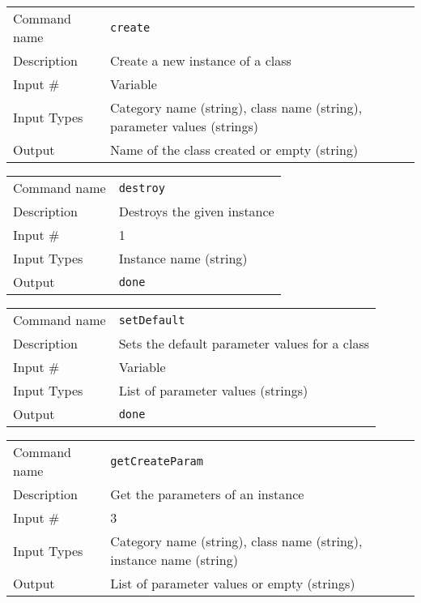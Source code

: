 \noindent
\begin{tabular}{l|p{5in}}
\hline
Command name & {\tt create} \\
Description  & Create a new instance of a class \\
Input \#     & Variable \\
Input Types  & Category name (string), class name (string), parameter values
               (strings) \\
Output       & Name of the class created or empty (string) \\
\hline
\end{tabular}

\bigskip

\noindent
\begin{tabular}{l|p{5in}}
\hline
Command name & {\tt destroy} \\
Description  & Destroys the given instance \\
Input \#     & 1 \\
Input Types  & Instance name (string) \\
Output       & {\tt done} \\
\hline
\end{tabular}

\bigskip

\noindent
\begin{tabular}{l|p{5in}}
\hline
Command name & {\tt setDefault} \\
Description  & Sets the default parameter values for a class \\
Input \#     & Variable \\
Input Types  & List of parameter values (strings) \\
Output       & {\tt done} \\
\hline
\end{tabular}

\bigskip

\noindent
\begin{tabular}{l|p{5in}}
\hline
Command name & {\tt getCreateParam} \\
Description  & Get the parameters of an instance \\
Input \#     & 3 \\
Input Types  & Category name (string), class name (string), instance
               name (string) \\
Output       & List of parameter values or empty (strings) \\
\hline
\end{tabular}

